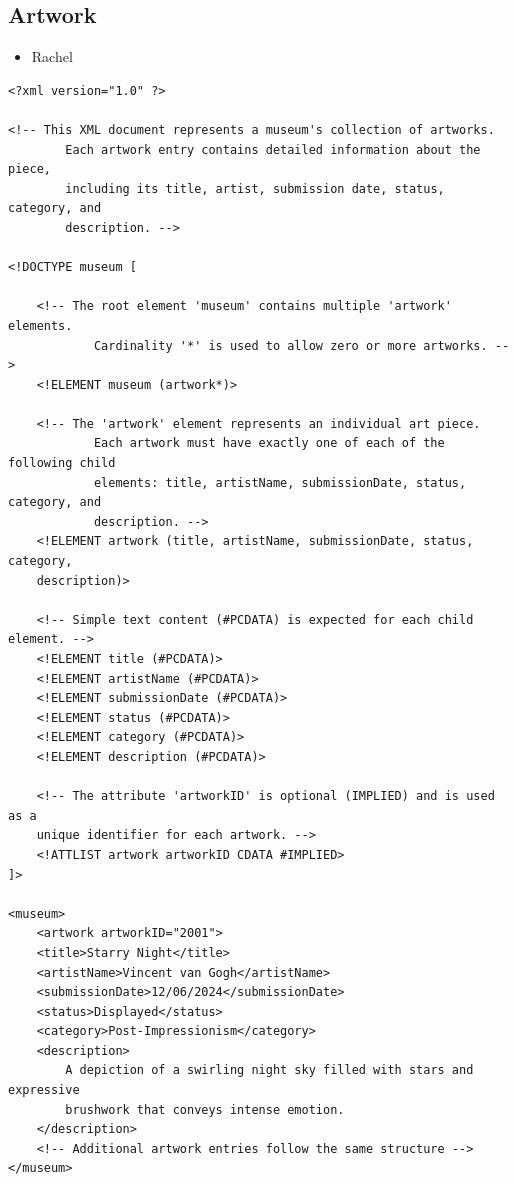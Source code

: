 \documentclass{article} %
\begin{document}
\subsection{Artwork}

\begin{itemize}
    \item Rachel
\end{itemize}

\begin{verbatim}
<?xml version="1.0" ?>

<!-- This XML document represents a museum's collection of artworks. 
        Each artwork entry contains detailed information about the piece,
        including its title, artist, submission date, status, category, and 
        description. -->

<!DOCTYPE museum [

    <!-- The root element 'museum' contains multiple 'artwork' elements. 
            Cardinality '*' is used to allow zero or more artworks. -->
    <!ELEMENT museum (artwork*)>

    <!-- The 'artwork' element represents an individual art piece.
            Each artwork must have exactly one of each of the following child 
            elements: title, artistName, submissionDate, status, category, and 
            description. -->
    <!ELEMENT artwork (title, artistName, submissionDate, status, category, 
    description)>

    <!-- Simple text content (#PCDATA) is expected for each child element. -->
    <!ELEMENT title (#PCDATA)>
    <!ELEMENT artistName (#PCDATA)>
    <!ELEMENT submissionDate (#PCDATA)>
    <!ELEMENT status (#PCDATA)>
    <!ELEMENT category (#PCDATA)>
    <!ELEMENT description (#PCDATA)>

    <!-- The attribute 'artworkID' is optional (IMPLIED) and is used as a 
    unique identifier for each artwork. -->
    <!ATTLIST artwork artworkID CDATA #IMPLIED>
]>

<museum>
    <artwork artworkID="2001">
    <title>Starry Night</title>
    <artistName>Vincent van Gogh</artistName>
    <submissionDate>12/06/2024</submissionDate>
    <status>Displayed</status>
    <category>Post-Impressionism</category>
    <description>
        A depiction of a swirling night sky filled with stars and expressive 
        brushwork that conveys intense emotion.
    </description>
    <!-- Additional artwork entries follow the same structure -->
</museum>
\end{verbatim}
\end{document}

